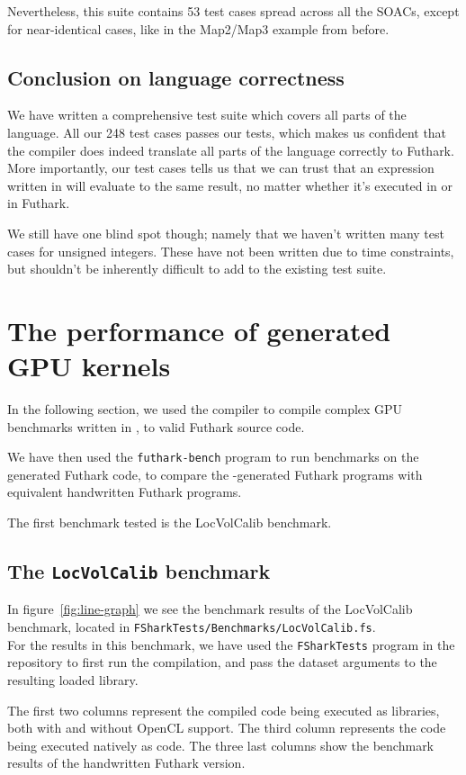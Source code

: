 Nevertheless, this suite contains 53 test cases spread across all the SOACs, except for near-identical cases, like in the Map2/Map3 example from before.

\subsection{Conclusion on \fshark{} language correctness}
We have written a comprehensive test suite which covers all parts of the \fshark{}
language. All our 248 test cases passes our tests, which makes us confident that
the \fshark{} compiler does indeed translate all parts of the \fshark{} language
correctly to Futhark.
More importantly, our test cases tells us that we can trust that an expression
written in \fshark{} will evaluate to the same result, no matter whether it's
executed in \fsharp{} or in Futhark.

We still have one blind spot though; namely that we haven't written many test
cases for unsigned integers.
These have not been written due to time constraints, but shouldn't be inherently
difficult to add to the existing test suite.

\section{The performance of \fshark{} generated GPU kernels}
\label{sec:fsharkgpubenchmarks}
In the following section, we used the \fshark{} compiler to compile complex GPU
benchmarks written in \fshark{}, to valid Futhark source code.

We have then used the \texttt{futhark-bench} program to run benchmarks on the
\fshark{} generated Futhark code, to compare the \fshark{}-generated Futhark
programs with equivalent handwritten Futhark programs.

The first benchmark tested is the LocVolCalib benchmark.
\subsection{The \texttt{LocVolCalib} benchmark}
In figure~\ref{fig:line-graph} we see the benchmark results of the LocVolCalib benchmark, located in \texttt{FSharkTests/Benchmarks/LocVolCalib.fs}.\\
For the \fsharp{} results in this benchmark, we have used the \texttt{FSharkTests} program in the
\fshark{} repository to first run the compilation, and pass the dataset
arguments to the resulting loaded library.

The first two columns represent the compiled \fshark{} code being executed as
\csharp{} libraries, both with and without OpenCL support.
The third column represents the \fshark{} code being executed natively as
\fsharp{} code.
The three last columns show the benchmark results of the handwritten Futhark
version.


